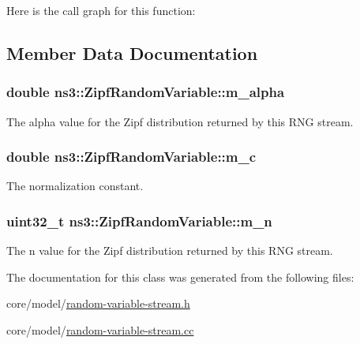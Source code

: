 Here is the call graph for this function\+:




\subsection{Member Data Documentation}
\subsubsection[{\texorpdfstring{m\+\_\+alpha}{m_alpha}}]{\setlength{\rightskip}{0pt plus 5cm}double ns3\+::\+Zipf\+Random\+Variable\+::m\+\_\+alpha\hspace{0.3cm}{\ttfamily [private]}}\hypertarget{classns3_1_1ZipfRandomVariable_a9583e78be81f0ef5a46d9893dcec5556}{}\label{classns3_1_1ZipfRandomVariable_a9583e78be81f0ef5a46d9893dcec5556}
The alpha value for the Zipf distribution returned by this R\+NG stream. 
\subsubsection[{\texorpdfstring{m\+\_\+c}{m_c}}]{\setlength{\rightskip}{0pt plus 5cm}double ns3\+::\+Zipf\+Random\+Variable\+::m\+\_\+c\hspace{0.3cm}{\ttfamily [private]}}\hypertarget{classns3_1_1ZipfRandomVariable_a4e5d128f53e226f84340471095380ab0}{}\label{classns3_1_1ZipfRandomVariable_a4e5d128f53e226f84340471095380ab0}
The normalization constant. 
\subsubsection[{\texorpdfstring{m\+\_\+n}{m_n}}]{\setlength{\rightskip}{0pt plus 5cm}uint32\+\_\+t ns3\+::\+Zipf\+Random\+Variable\+::m\+\_\+n\hspace{0.3cm}{\ttfamily [private]}}\hypertarget{classns3_1_1ZipfRandomVariable_ab8a445c68948057e97c1c95f6f684c73}{}\label{classns3_1_1ZipfRandomVariable_ab8a445c68948057e97c1c95f6f684c73}
The n value for the Zipf distribution returned by this R\+NG stream. 

The documentation for this class was generated from the following files\+:\begin{DoxyCompactItemize}
\item 
core/model/\hyperlink{random-variable-stream_8h}{random-\/variable-\/stream.\+h}\item 
core/model/\hyperlink{random-variable-stream_8cc}{random-\/variable-\/stream.\+cc}\end{DoxyCompactItemize}
